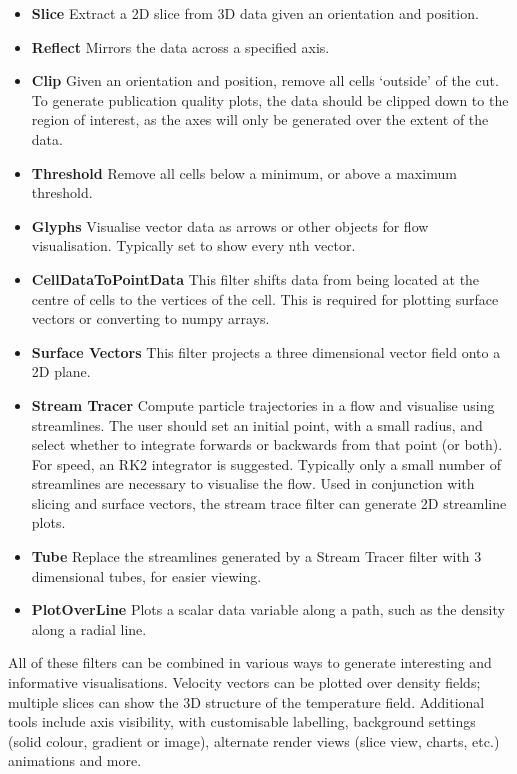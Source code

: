 \documentclass[preprint2]{aastex62}
\begin{document}
\begin{itemize}
\item[]\textbf{Slice}
Extract a 2D slice from 3D data given an orientation and position.

\item[]\textbf{Reflect}
Mirrors the data across a specified axis.

\item[]\textbf{Clip}
Given an orientation and position, remove all cells `outside' of the cut. To generate publication quality plots, the data should be clipped down to the region of interest, as the axes will only be generated over the extent of the data.

\item[]\textbf{Threshold}
Remove all cells below a minimum, or above a maximum threshold.

\item[]\textbf{Glyphs}
Visualise vector data as arrows or other objects for flow visualisation. Typically set to show every nth vector.

\item[]\textbf{CellDataToPointData}
This filter shifts data from being located at the centre of cells to the vertices of the cell. This is required for plotting surface vectors or converting to numpy arrays.

\item[]\textbf{Surface Vectors}
This filter projects a three dimensional vector field onto a 2D plane.

\item[]\textbf{Stream Tracer}
Compute particle trajectories in a flow and visualise using streamlines. The user should set an initial point, with a small radius, and select whether to integrate forwards or backwards from that point (or both). For speed, an RK2 integrator is suggested. Typically only a small number of streamlines are necessary to visualise the flow. Used in conjunction with slicing and surface vectors, the stream trace filter can generate 2D streamline plots.

\item[]\textbf{Tube}
Replace the streamlines generated by a Stream Tracer filter with 3 dimensional tubes, for easier viewing.

\item[]\textbf{PlotOverLine}
Plots a scalar data variable along a path, such as the density along a radial line.
\end{itemize}
All of these filters can be combined in various ways to generate interesting and informative visualisations. Velocity vectors can be plotted over density fields; multiple slices can show the 3D structure of the temperature field. Additional tools include axis visibility, with customisable labelling, background settings (solid colour, gradient or image), alternate render views (slice view, charts, etc.) animations and more.
\end{document}
